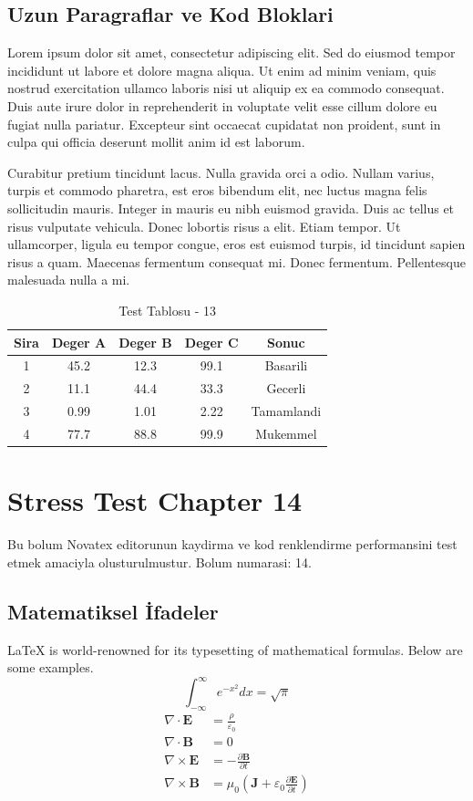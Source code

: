 \documentclass[12pt,a4paper]{article}
\begin{document}
\subsection{Uzun Paragraflar ve Kod Bloklari}
Lorem ipsum dolor sit amet, consectetur adipiscing elit. Sed do eiusmod tempor incididunt ut labore et dolore magna aliqua. Ut enim ad minim veniam, quis nostrud exercitation ullamco laboris nisi ut aliquip ex ea commodo consequat. Duis aute irure dolor in reprehenderit in voluptate velit esse cillum dolore eu fugiat nulla pariatur. Excepteur sint occaecat cupidatat non proident, sunt in culpa qui officia deserunt mollit anim id est laborum.

Curabitur pretium tincidunt lacus. Nulla gravida orci a odio. Nullam varius, turpis et commodo pharetra, est eros bibendum elit, nec luctus magna felis sollicitudin mauris. Integer in mauris eu nibh euismod gravida. Duis ac tellus et risus vulputate vehicula. Donec lobortis risus a elit. Etiam tempor. Ut ullamcorper, ligula eu tempor congue, eros est euismod turpis, id tincidunt sapien risus a quam. Maecenas fermentum consequat mi. Donec fermentum. Pellentesque malesuada nulla a mi.

\begin{table}[h!]
\centering
\begin{tabular}{|c|c|c|c|c|}
\hline
\textbf{Sira} & \textbf{Deger A} & \textbf{Deger B} & \textbf{Deger C} & \textbf{Sonuc} \\
\hline
1 & 45.2 & 12.3 & 99.1 & Basarili \\
2 & 11.1 & 44.4 & 33.3 & Gecerli \\
3 & 0.99 & 1.01 & 2.22 & Tamamlandi \\
4 & 77.7 & 88.8 & 99.9 & Mukemmel \\
\hline
\end{tabular}
\caption{Test Tablosu - 13}
\end{table}

\newpage
\section{Stress Test Chapter 14}
Bu bolum Novatex editorunun kaydirma ve kod renklendirme performansini test etmek amaciyla olusturulmustur. Bolum numarasi: 14.

\subsection{Matematiksel İfadeler}
\LaTeX{} is world-renowned for its typesetting of mathematical formulas. Below are some examples.
\begin{equation}
\int_{-\infty}^{\infty} e^{-x^2} dx = \sqrt{\pi}
\end{equation}
\begin{align}
\nabla \cdot \mathbf{E} &= \frac{\rho}{\varepsilon_0} \\
\nabla \cdot \mathbf{B} &= 0 \\
\nabla \times \mathbf{E} &= -\frac{\partial \mathbf{B}}{\partial t} \\
\nabla \times \mathbf{B} &= \mu_0\left(\mathbf{J} + \varepsilon_0 \frac{\partial \mathbf{E}}{\partial t}\right)
\end{align}
\end{document}
